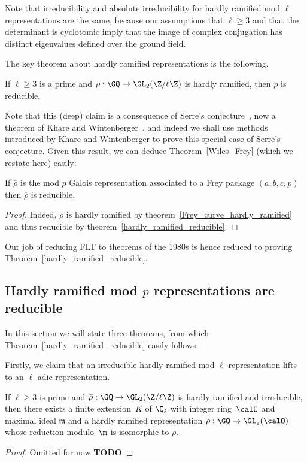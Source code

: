 Note that irreducibility and absolute irreducibility for hardly ramified mod $\ell$ representations
are the same, because our assumptions that $\ell\geq3$
and that the determinant is cyclotomic imply that the image of complex conjugation
has distinct eigenvalues defined over the ground field.

The key theorem about hardly ramified representations is the following.

\begin{theorem}
  \label{hardly_ramified_reducible}
  \leanok
  If $\ell\geq 3$ is a prime and $\rho:\GQ\to\GL_2(\Z/\ell\Z)$ is hardly ramified,
  then $\rho$ is reducible.
\end{theorem}

Note that this (deep) claim is a consequence of Serre's conjecture~\cite{serreconj},
now a theorem of Khare and Wintenberger~\cite{kwII}, and indeed we shall use
methods introduced by Khare and Wintenberger to prove this special case of
Serre's conjecture. Given this result, we can deduce Theorem~\ref{Wiles_Frey}
(which we restate here) easily:

\begin{theorem}
  \label{Wiles_Frey_again}
  \leanok
  If $\overline{\rho}$ is the mod $p$ Galois representation associated to a Frey package $(a,b,c,p)$ then
  $\overline{\rho}$ is reducible.
\end{theorem}
\begin{proof}
  Indeed, $\rho$ is hardly ramified by theorem~\ref{Frey_curve_hardly_ramified}
  and thus reducible by theorem~\ref{hardly_ramified_reducible}.
\end{proof}

Our job of reducing FLT to theorems of the 1980s is hence reduced to proving
Theorem~\ref{hardly_ramified_reducible}.

\subsection{Hardly ramified mod $p$ representations are reducible}

In this section we will state three theorems, from which Theorem~\ref{hardly_ramified_reducible}
easily follows.

Firstly, we claim that
an irreducible hardly ramified mod $\ell$ representation lifts to an $\ell$-adic representation.

\begin{theorem}
  \label{hardly_ramified_lifts}
  \leanok
  If $\ell\geq3$ is prime and $\overline{\rho}:\GQ\to\GL_2(\Z/\ell\Z)$
  is hardly ramified and irreducible, then there exists a finite extension~$K$ of $\Q_\ell$
  with integer ring~$\calO$ and maximal ideal $\mathfrak{m}$
  and a hardly ramified representation
  $\rho:\GQ\to\GL_2(\calO)$ whose reduction modulo~$\m$ is isomorphic to $\rho$.
\end{theorem}
\begin{proof}
  Omitted for now {\bf TODO}
\end{proof}

